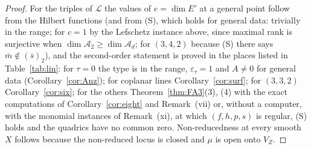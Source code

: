 \documentclass[11pt]{article}
\numberwithin{equation}{section}
\theoremstyle{remark}
\newcommand{\VZ}{V_Z}
\newcommand{\cA}{\mathcal{A}}
\newcommand{\et}{\varepsilon_\tau}
\begin{document}
\begin{proof}
For the triples of $\mathcal L$ the values of $e=\dim E'$ at a general point follow from the Hilbert functions
(and from (S), which holds for general data: trivially in the range; for $c=1$ by the Lefschetz instance above,
since maximal rank is surjective when $\dim\cA_2\ge\dim\cA_d$; for $(3,4,2)$ because (S) there says
$\bar m\notin(\bar s)_2$), and the second-order statement is proved in the
places listed in Table~\ref{tab:lin}: for $\tau=0$ the type is in the range, $\et=1$ and $A\ne0$ for general data
(Corollary~\ref{cor:Anz}); for coplanar lines Corollary~\ref{cor:surf}; for $(3,3,2)$ Corollary~\ref{cor:six}; for
the others Theorem~\ref{thm:FA3}(3), (4) with the exact computations of Corollary~\ref{cor:eight} and
Remark~(vii) or, without a computer, with the monomial instances of Remark~(xi), at which $(f,h,p,s)$ is
regular, (S) holds and the quadrics have no common zero.
Non-reducedness at every smooth $X$ follows because the non-reduced locus is closed and $\mu$ is open onto
$\VZ$.
\end{proof}
\end{document}
